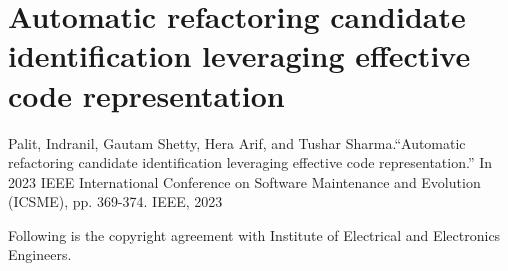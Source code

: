 \section{Automatic refactoring candidate identification leveraging effective code representation}\label{copyright}

Palit, Indranil, Gautam Shetty, Hera Arif, and Tushar Sharma.“Automatic
refactoring candidate identification leveraging effective code representation.” In
2023 IEEE International Conference on Software Maintenance and Evolution
(ICSME), pp. 369-374. IEEE, 2023

Following is the copyright agreement with Institute of Electrical and Electronics
Engineers.



